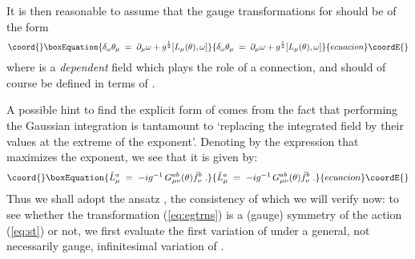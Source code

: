 \documentclass[a4paper,12pt]{article}
\begin{document}
It is then reasonable to assume that the gauge transformations for
\myHighlight{$\theta$}\coordHE{} should be of the form
\begin{equation}\coord{}\boxEquation{\label{eq:egtrns}
\delta_\omega \theta_\mu \;=\; \partial_\mu \omega + g^{\frac{1}{2}} [L_\mu(\theta) , \omega]
}{\delta_\omega \theta_\mu \;=\; \partial_\mu \omega + g^{\frac{1}{2}} [L_\mu(\theta) , \omega]
}{ecuacion}\coordE{}\end{equation}
where \coordHE{} is a {\em dependent\/} field which plays the
role of a connection, and should of course be defined in terms of
\myHighlight{$\theta$}\coordHE{}.

A possible hint to find the explicit form of \coordHE{} comes
from the fact that performing the Gaussian integration is tantamount
to `replacing the integrated field by their values at the extreme of
the exponent'.  Denoting by \coordHE{} the expression that
maximizes the exponent, we see that it is given by:
\begin{equation}\coord{}\boxEquation{\label{eq:ltheta}
{\hat L}^a_\mu \;=\; - i g^{-1} \, G_{\mu\nu}^{ab}(\theta) {\tilde f}_\nu^b\;.
}{{\hat L}^a_\mu \;=\; - i g^{-1} \, G_{\mu\nu}^{ab}(\theta) {\tilde f}_\nu^b\;.
}{ecuacion}\coordE{}\end{equation}
Thus we shall adopt the ansatz \coordHE{}, the consistency of which we will verify now: to see whether
the transformation (\ref{eq:egtrns}) is a (gauge) symmetry of the
action (\ref{eq:st}) or not, we first evaluate the first variation of
\coordHE{} under a general, not necessarily gauge,
infinitesimal variation of \myHighlight{$\theta$}\coordHE{}.
\end{document}
